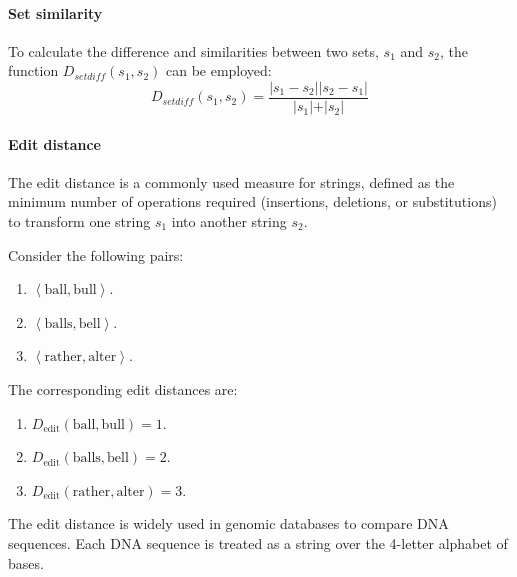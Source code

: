 \paragraph*{Set similarity}
To calculate the difference and similarities between two sets, $s_1$ and $s_2$, the function $D_{setdiff}(s_1,s_2)$ can be employed: 
\[D_{setdiff}(s_1,s_2)=\dfrac{\left\lvert s_1 - s_2 \right\rvert \left\lvert s_2 - s_1 \right\rvert }{\left\lvert s_1 \left\lvert +\right\rvert s_2 \right\rvert}\]

\paragraph*{Edit distance}
The edit distance is a commonly used measure for strings, defined as the minimum number of operations required (insertions, deletions, or substitutions) to transform one string $s_1$ into another string $s_2$. 
\begin{example}
    Consider the following pairs: 
    \begin{enumerate}
        \item $\left\langle \text{ball},\text{bull} \right\rangle$.
        \item $\left\langle \text{balls},\text{bell} \right\rangle$.
        \item $\left\langle \text{rather},\text{alter} \right\rangle$.
    \end{enumerate}
    The corresponding edit distances are: 
    \begin{enumerate}
        \item $D_{\text{edit}}(\text{ball},\text{bull})=1$.
        \item $D_{\text{edit}}(\text{balls},\text{bell})=2$.
        \item $D_{\text{edit}}(\text{rather},\text{alter})=3$.
    \end{enumerate}
\end{example}
The edit distance is widely used in genomic databases to compare DNA sequences. 
Each DNA sequence is treated as a string over the 4-letter alphabet of bases.
